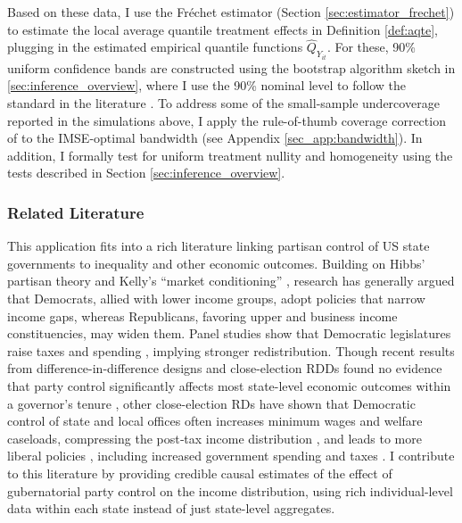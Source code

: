 \documentclass[12pt]{article}
\begin{document}
Based on these data, I use the Fréchet estimator (Section \ref{sec:estimator_frechet}) to estimate the local average quantile treatment effects in Definition \ref{def:aqte}, plugging in the estimated empirical quantile functions $\widehat{Q}_{Y_{it}}$. For these, 90\% uniform confidence bands are constructed using the bootstrap algorithm sketch in \ref{sec:inference_overview}, where I use the 90\% nominal level to follow the standard in the literature \citep{frandsen2012quantile, qu2019uniform, chiang2019causal}. To address some of the small-sample undercoverage reported in the simulations above, I apply the rule-of-thumb coverage correction of \citet{calonico2018effect} to the IMSE-optimal bandwidth (see Appendix \ref{sec_app:bandwidth}). In addition, I formally test for uniform treatment nullity and homogeneity using the tests described in Section \ref{sec:inference_overview}.

\subsubsection{Related Literature}

This application fits into a rich literature linking partisan control of US state governments to inequality and other economic outcomes. Building on Hibbs' partisan theory \citep{hibbs1977political} and Kelly’s ``market conditioning'' \citep{kelly2009politics}, research has generally argued that Democrats, allied with lower income groups, adopt policies that narrow income gaps, whereas Republicans, favoring upper and business income constituencies, may widen them. Panel studies show that Democratic legislatures raise taxes and spending \citep{reed2006democrat}, implying stronger redistribution. Though recent results from difference-in-difference designs and close-election RDDs found no evidence that party control significantly affects most state-level economic outcomes within a governor's tenure \citep{dynes2020noisy}, other close-election RDs have shown that Democratic control of state and local offices often increases minimum wages and welfare caseloads, compressing the post‐tax income distribution \citep{leigh2008estimating}, 
and leads to more liberal policies \citep{caughey2017incremental}, including increased government spending and taxes \citep{de2016mayoral}. I contribute to this literature by providing credible causal estimates of the effect of gubernatorial party control on the income distribution, using rich individual-level data within each state instead of just state-level aggregates.
\end{document}
